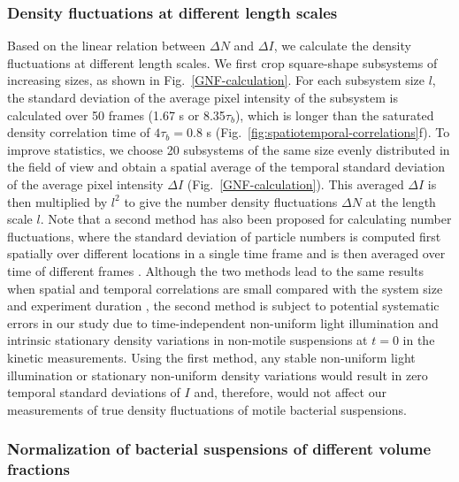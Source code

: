 \documentclass[9pt,twoside,lineno]{pnas-new}
\begin{document}
\FloatBarrier

\subsubsection{Density fluctuations at different length scales}

Based on the linear relation between $\Delta N$ and $\Delta I$, we calculate the density fluctuations at different length scales. We first crop square-shape subsystems of increasing sizes, as shown in Fig.~\ref{GNF-calculation}. For each subsystem size $l$, the standard deviation of the average pixel intensity of the subsystem is calculated over 50 frames (1.67 s or 8.35$\tau_b$), which is longer than the saturated density correlation time of $4\tau_b = 0.8$ s (Fig.~\ref{fig:spatiotemporal-correlations}f). To improve statistics, we choose 20 subsystems of the same size evenly distributed in the field of view and obtain a spatial average of the temporal standard deviation of the average pixel intensity $\Delta I$ (Fig.~\ref{GNF-calculation}). This averaged $\Delta I$ is then multiplied by $l^2$ to give the number density fluctuations $\Delta N$ at the length scale $l$. Note that a second method has also been proposed for calculating number fluctuations, where the standard deviation of particle numbers is computed first spatially over different locations in a single time frame and is then averaged over time of different frames \cite{Aranson2008}.  Although the two methods lead to the same results when spatial and temporal correlations are small compared with the system size and experiment duration \cite{Aranson2008}, the second method is subject to potential systematic errors in our study due to time-independent non-uniform light illumination and intrinsic stationary density variations in non-motile suspensions at $t=0$ in the kinetic measurements. Using the first method, any stable non-uniform light illumination or stationary non-uniform density variations would result in zero temporal standard deviations of $I$ and, therefore, would not affect our measurements of true density fluctuations of motile bacterial suspensions.


\subsubsection{Normalization of bacterial suspensions of different volume fractions}
\end{document}
